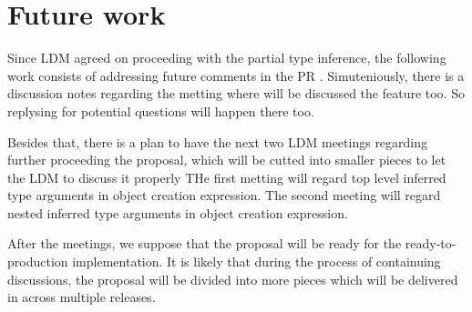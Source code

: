 \chapter{Future work} \label{sect14:future}

Since \ac{LDM} agreed on proceeding with the partial type inference, the following work consists of addressing future comments in the PR \cite{online:pull2}.
Simuteniously, there is a discussion notes regarding the metting where will be discussed the feature too.
So replysing for potential questions will happen there too.
\par
Besides that, there is a plan to have the next two \ac{LDM} meetings regarding further proceeding the proposal, which will be cutted into smaller pieces to let the \ac{LDM} to discuss it properly
THe first metting will regard top level inferred type arguments in object creation expression.
The second meeting will regard nested inferred type arguments in object creation expression.
\par
After the meetings, we suppose that the proposal will be ready for the ready-to-production implementation.
It is likely that during the process of containuing discussions, the proposal will be divided into more pieces which will be delivered in across multiple releases.